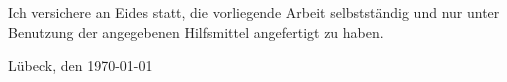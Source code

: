 \thispagestyle{empty}

\vspace*{7cm}
\noindent Ich versichere an Eides statt, die vorliegende Arbeit selbstständig und nur unter Benutzung der angegebenen Hilfsmittel angefertigt zu haben.

\vspace*{3cm}
\noindent Lübeck, den \today
\newpage
